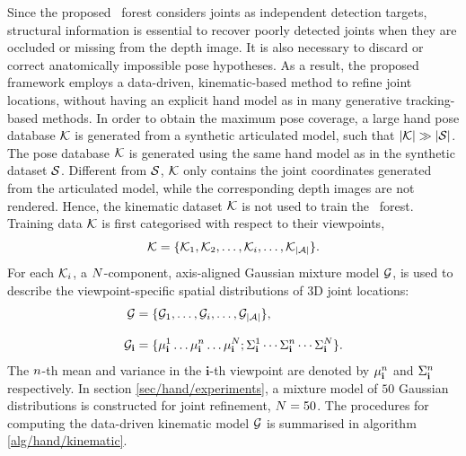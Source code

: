 Since the proposed \STR\ forest considers joints as independent detection targets, structural information is essential to recover poorly detected joints when they are occluded or missing from the depth image. 
It is also necessary to discard or correct anatomically impossible pose hypotheses.    
As a result, the proposed framework employs a data-driven, kinematic-based method to refine joint locations, without having an explicit hand model as in many generative tracking-based methods. 
In order to obtain the maximum pose coverage, a large hand pose database $\mathcal{K}$ is generated from a synthetic articulated model, such that $|\mathcal{K}| \gg |\mathcal{S}|$. 
The pose database $\mathcal{K}$ is generated using the same hand model as in the synthetic dataset $\mathcal{S}$. Different from $\mathcal{S}$, $\mathcal{K}$ only contains the joint coordinates generated from the articulated model, while the corresponding depth images are not rendered. 
Hence, the kinematic dataset $\mathcal{K}$ is not used to train the \STR\ forest. 
Training data $\mathcal{K}$ is first categorised with respect to their viewpoints,  
\begin{equation}
	\label{eqn/hand/datadrivenclassify} 
	\mathcal{K} = \{ \mathcal{K}_{1}, \mathcal{K}_{2}, \dots,  \mathcal{K}_{i}, \dots, \mathcal{K}_{|\mathcal{A}|}\}.
\end{equation}
For each $\mathcal{K}_{i}$, a $N$-component, axis-aligned Gaussian mixture model $\mathcal{G}$, is used to describe the viewpoint-specific spatial distributions of 3D joint locations:
\begin{equation}
	\begin{aligned}
		\mathcal{G} & = \{ \mathcal{G}_{1}, \dots, \mathcal{G}_{i}, \dots, \mathcal{G}_{|\mathcal{A}|} \}, \\[3mm] 
		\mathcal{G}_{\mathbf{i}} & = \{\mu_{\mathbf{i}}^{1}\dots\mu_{\mathbf{i}}^{n}\dots\mu_{\mathbf{i}}^{N};\Sigma_{\mathbf{i}}^{1}\cdots\Sigma_{\mathbf{i}}^{n}\cdots\Sigma_{\mathbf{i}}^{N}\}.
	\end{aligned}
\end{equation}
The $n$-th mean and variance in the $\mathbf{i}$-th viewpoint are denoted by $\mu_{\mathbf{i}}^{n}$ and $\Sigma_{\mathbf{i}}^{n}$ respectively. 
In section \ref{sec/hand/experiments}, a mixture model of $50$ Gaussian distributions is constructed for joint refinement, \ie $N = 50$. 
The procedures for computing the data-driven kinematic model $\mathcal{G}$ is summarised in algorithm \ref{alg/hand/kinematic}. 

